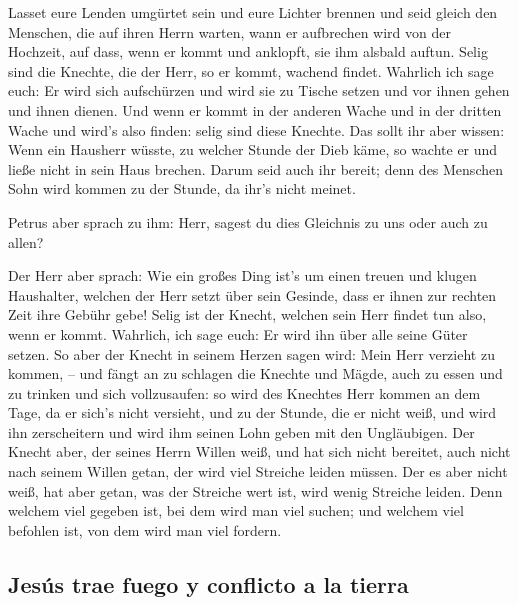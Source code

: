  Lasset eure Lenden umgürtet sein und eure Lichter
brennen  und seid gleich den Menschen, die auf ihren
Herrn warten, wann er aufbrechen wird von der Hochzeit, auf dass, wenn
er kommt und anklopft, sie ihm alsbald auftun.  Selig
sind die Knechte, die der Herr, so er kommt, wachend findet. Wahrlich
ich sage euch: Er wird sich aufschürzen und wird sie zu Tische setzen
und vor ihnen gehen und ihnen dienen.  Und wenn er kommt
in der anderen Wache und in der dritten Wache und wird's also finden:
selig sind diese Knechte.  Das sollt ihr aber wissen:
Wenn ein Hausherr wüsste, zu welcher Stunde der Dieb käme, so wachte er
und ließe nicht in sein Haus brechen.  Darum seid auch
ihr bereit; denn des Menschen Sohn wird kommen zu der Stunde, da ihr's
nicht meinet.

 Petrus aber sprach zu ihm: Herr, sagest du dies
Gleichnis zu uns oder auch zu allen?

 Der Herr aber sprach: Wie ein großes Ding ist's um einen
treuen und klugen Haushalter, welchen der Herr setzt über sein Gesinde,
dass er ihnen zur rechten Zeit ihre Gebühr gebe!  Selig
ist der Knecht, welchen sein Herr findet tun also, wenn er kommt.
 Wahrlich, ich sage euch: Er wird ihn über alle seine
Güter setzen.  So aber der Knecht in seinem Herzen sagen
wird: Mein Herr verzieht zu kommen, -- und fängt an zu schlagen die
Knechte und Mägde, auch zu essen und zu trinken und sich vollzusaufen:
 so wird des Knechtes Herr kommen an dem Tage, da er
sich's nicht versieht, und zu der Stunde, die er nicht weiß, und wird
ihn zerscheitern und wird ihm seinen Lohn geben mit den Ungläubigen.
 Der Knecht aber, der seines Herrn Willen weiß, und hat
sich nicht bereitet, auch nicht nach seinem Willen getan, der wird viel
Streiche leiden müssen.  Der es aber nicht weiß, hat aber
getan, was der Streiche wert ist, wird wenig Streiche leiden. Denn
welchem viel gegeben ist, bei dem wird man viel suchen; und welchem viel
befohlen ist, von dem wird man viel fordern.

\hypertarget{jesuxfas-trae-fuego-y-conflicto-a-la-tierra}{%
\subsection{Jesús trae fuego y conflicto a la
tierra}\label{jesuxfas-trae-fuego-y-conflicto-a-la-tierra}}

